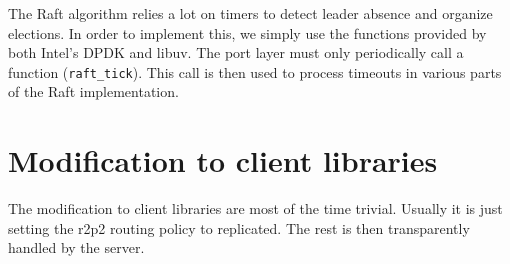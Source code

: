 The Raft algorithm relies a lot on timers to detect leader absence and organize elections.
In order to implement this, we simply use the functions provided by both Intel's DPDK and libuv.
The port layer must only periodically call a function (\texttt{raft\_tick}).
This call is then used to process timeouts in various parts of the Raft implementation.

\section{Modification to client libraries}

The modification to client libraries are most of the time trivial.
Usually it is just setting the \gls{r2p2} routing policy to replicated.
The rest is then transparently handled by the server.
